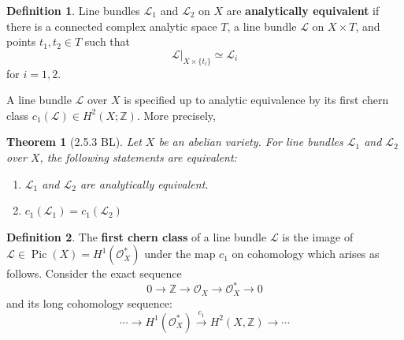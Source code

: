 \documentclass[12pt,reqno]{amsart}
\DeclareMathOperator{\Pic}{Pic}
\newcommand{\Z}{\mathbb{Z}}
\newcommand{\mc}{\mathcal}
\newtheorem*{thm*}{Theorem}
\theoremstyle{definition}
\newtheorem{defn}{Definition}
\theoremstyle{remark}
\newcommand{\ti}{\todo[inline]}
\begin{document}
\begin{defn} Line bundles $\mc{L}_1$ and $\mc{L}_2$  on $X$ are \textbf{analytically equivalent} if there is a connected complex analytic space $T$, a line bundle $\mc{L}$ on $X \times T$, and points $t_1, t_2 \in T$ such that $$\mc{L} |_{X\times \{t_i\}} \simeq \mc{L}_i$$ for $i = 1, 2$. \end{defn}

A line bundle $\mc{L}$ over $X$ is specified up to analytic equivalence by its first chern class $c_1(\mc{L}) \in H^2(X; \Z)$. More precisely,

\begin{thm*} 
[2.5.3 BL] Let $X$ be an abelian variety. For line bundles $\mc{L}_1$ and $\mc{L}_2$ over $X$, the following statements are equivalent: 
\begin{enumerate} 
\item $\mc{L}_1$ and $\mc{L}_2$ are analytically equivalent.
\item $c_1(\mc{L}_1) = c_1(\mc{L}_2)$
\end{enumerate}
\end{thm*}






\begin{defn} The \textbf{first chern class} of a line bundle $\mc{L}$ is the image of $\mc{L} \in \Pic(X) = H^1(\mc{O}_X^*)$ under the map $c_1$ on cohomology which arises as follows. Consider the exact sequence $$0 \to \Z \to \mc{O}_X \to \mc{O}_X^* \to 0$$ and its long cohomology sequence:
$$\cdots \to H^1(\mc{O}_X^*) \xrightarrow{c_1} H^2(X, \Z) \to \cdots$$ \end{defn} 




\end{document}
